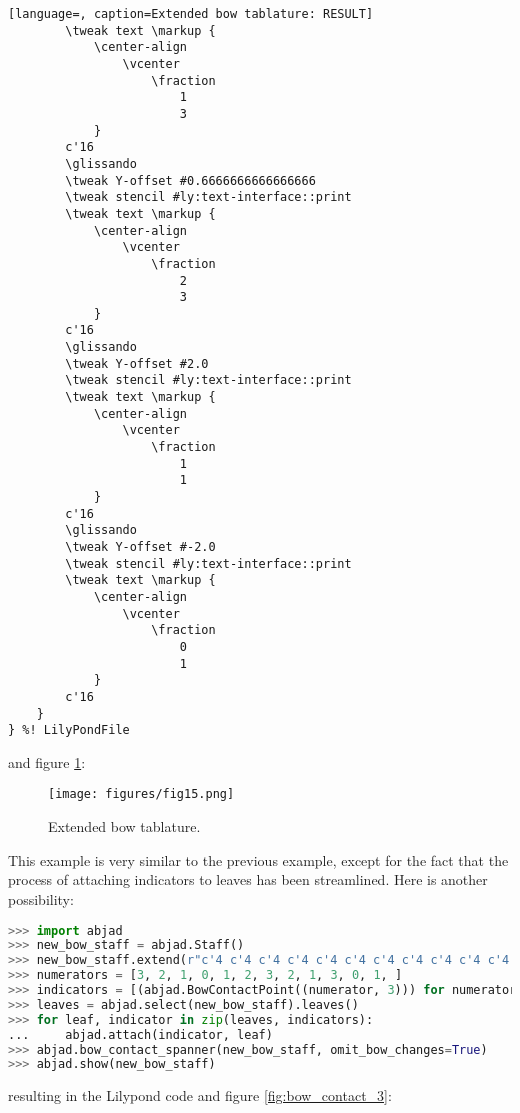 \begin{lstlisting}[language=, caption=Extended bow tablature: RESULT]
        \tweak text \markup {
            \center-align
                \vcenter
                    \fraction
                        1
                        3
            }
        c'16
        \glissando
        \tweak Y-offset #0.6666666666666666
        \tweak stencil #ly:text-interface::print
        \tweak text \markup {
            \center-align
                \vcenter
                    \fraction
                        2
                        3
            }
        c'16
        \glissando
        \tweak Y-offset #2.0
        \tweak stencil #ly:text-interface::print
        \tweak text \markup {
            \center-align
                \vcenter
                    \fraction
                        1
                        1
            }
        c'16
        \glissando
        \tweak Y-offset #-2.0
        \tweak stencil #ly:text-interface::print
        \tweak text \markup {
            \center-align
                \vcenter
                    \fraction
                        0
                        1
            }
        c'16
    }
} %! LilyPondFile
\end{lstlisting}
\doublespace

and figure \ref{fig:bow_contact_2}:

\singlespace
\begin{figure}[h]
  \texttt{[image: figures/fig15.png]}
  \caption{Extended bow tablature.}
  \label{fig:bow_contact_2}
\end{figure}
\doublespace

This example is very similar to the previous example, except for the fact that the process of attaching indicators to leaves has been streamlined. Here is another possibility:

\singlespace
\begin{lstlisting}[language=Python, caption=Very long bow tablature]
>>> import abjad
>>> new_bow_staff = abjad.Staff()
>>> new_bow_staff.extend(r"c'4 c'4 c'4 c'4 c'4 c'4 c'4 c'4 c'4 c'4 c'4 c'4")
>>> numerators = [3, 2, 1, 0, 1, 2, 3, 2, 1, 3, 0, 1, ]
>>> indicators = [(abjad.BowContactPoint((numerator, 3))) for numerator in numerators]
>>> leaves = abjad.select(new_bow_staff).leaves()
>>> for leaf, indicator in zip(leaves, indicators):
...     abjad.attach(indicator, leaf)
>>> abjad.bow_contact_spanner(new_bow_staff, omit_bow_changes=True)
>>> abjad.show(new_bow_staff)
\end{lstlisting}
\doublespace

resulting in the Lilypond code and figure \ref{fig:bow_contact_3}:

